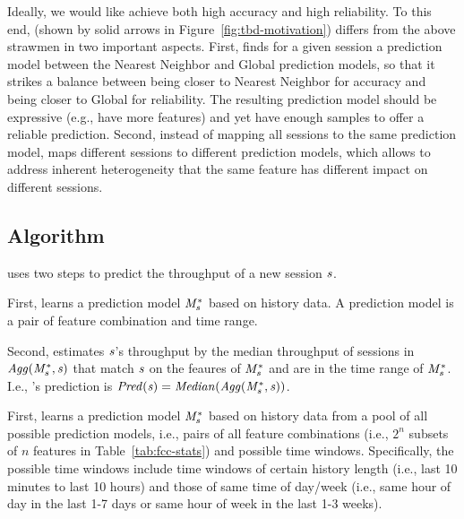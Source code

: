 Ideally, we would like achieve both high accuracy and high reliability. To this end, \name (shown by solid arrows in Figure~\ref{fig:tbd-motivation}) differs from the above strawmen in two important aspects. First, \name finds for a given session a prediction model between the Nearest Neighbor and Global prediction models, so that it  strikes a balance between being closer to Nearest Neighbor for accuracy and being closer to Global for reliability. The resulting prediction model should be expressive (e.g., have more features) and yet have enough samples to offer a reliable prediction.
Second, instead of mapping all sessions to the same prediction model, \name maps different sessions to different prediction models, which allows \name to address inherent heterogeneity that the same feature has different impact on different sessions.


\subsection{Algorithm}

 \name uses two steps to predict the throughput of a new session $\mathit{s}$.
\begin{packedenumerate}
\item First, \name learns a prediction model $\mathit{M}^{\mathit{*}}_{\mathit{s}}$ based on history data. A prediction model is a pair of feature combination and time range. 
\item Second, \name estimates $\mathit{s}$'s throughput by the median throughput of sessions in $\mathit{Agg(\mathit{M}^{\mathit{*}}_{\mathit{s}},\mathit{s})}$ that match $\mathit{s}$ on the feaures of $\mathit{M}^{\mathit{*}}_{\mathit{s}}$ and are in the time range of $\mathit{M}^{\mathit{*}}_{\mathit{s}}$. I.e., \name's prediction is $\mathit{Pred(\mathit{s})}=\mathit{Median}(\mathit{Agg(\mathit{M}^{\mathit{*}}_{\mathit{s}},\mathit{s})})$.
\end{packedenumerate}


 First, \name learns a prediction model $\mathit{M}^{\mathit{*}}_{\mathit{s}}$ based on history data from a pool of all possible prediction models, i.e., pairs of all feature combinations (i.e., $2^n$ subsets of $n$ features in Table~\ref{tab:fcc-stats}) and possible time windows. Specifically, the possible time windows include time windows of certain history length (i.e., last 10 minutes to last 10 hours) and those of same time of day/week (i.e., same hour of day in the last 1-7 days or same hour of week in the last 1-3 weeks). 

